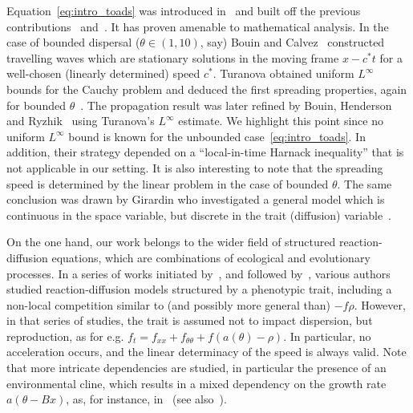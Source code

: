 \documentclass[10pt]{amsart}
\theoremstyle{definition}\newtheorem{defi}[theo]{Definition}\newtheorem{rema}[theo]{Remark}\newtheorem{exam}[theo]{Example}\newtheorem{exem}[theo]{Example}\newtheorem{nota}[theo]{Notation}
\newcommand{\1}{\mathds{1}}
\begin{document}
Equation~\eqref{eq:intro_toads} was introduced in~\cite{BenichouEtAl} and built off the previous contributions~\cite{ChampagnatMeleard} and~\cite{ArnoldDesvillettesPrevost}. It has proven amenable to mathematical analysis. In the case of bounded dispersal ($\theta\in (1,10)$, say) Bouin and Calvez~\cite{BouinCalvez} constructed travelling waves which are stationary solutions in the moving frame $x-c^*t$ for a well-chosen (linearly determined) speed $c^*$. Turanova obtained uniform $L^\infty$ bounds for the Cauchy problem and deduced the first spreading properties, again for bounded $\theta$~\cite{Turanova}. The propagation result was later refined by Bouin, Henderson and Ryzhik~\cite{BHR_LogDelay} using Turanova's $L^\infty$ estimate. We highlight this point since no uniform $L^\infty$ bound is known for the unbounded case~\eqref{eq:intro_toads}. In addition, their strategy depended on a ``local-in-time Harnack inequality'' that is not applicable in our setting. It is also interesting to note that the spreading speed is determined by the linear problem in the case of bounded $\theta$. The same conclusion was drawn by Girardin who investigated a general model which is continuous in the space variable, but discrete in the trait (diffusion) variable~\cite{girardin_non-cooperative_2018,girardin_non-cooperative_2018-1}.



On the one hand, our work belongs to the wider field of structured reaction-diffusion equations, which are combinations of ecological and evolutionary processes. In a series of works initiated by~\cite{AlfaroCovilleRaoul}, and followed by~\cite{AlfaroBerestyckiRaoul,BerestyckiJinSilvestre,BouinMirrahimi}, various authors studied reaction-diffusion models structured by a phenotypic trait, including a non-local competition similar to (and possibly more general than) $-f\rho$. However, in that series of studies, the trait is assumed not to impact dispersion, but reproduction, as for e.g. $f_t = f_{xx} + f_{\theta\theta} + f(a(\theta)-\rho)$. In particular, no acceleration occurs, and the linear determinacy of the speed is always valid. Note that more intricate dependencies are studied, in particular the presence of an environmental cline, which results in a mixed dependency on the growth rate $a(\theta - Bx)$, as, for instance, in~\cite{AlfaroBerestyckiRaoul,AlfaroCovilleRaoul} (see also~\cite{BouinMirrahimi}).
\end{document}
